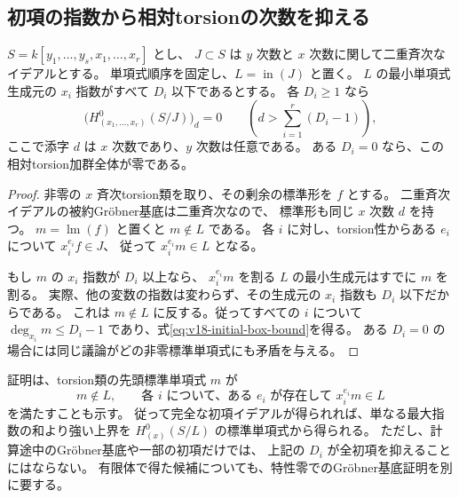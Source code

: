 \subsection{初項の指数から相対torsionの次数を抑える}

\begin{lemma}[初項の箱に入る相対torsion]
\label{lem:v18-initial-box-torsion}
$S=k[y_1,\ldots,y_s,x_1,\ldots,x_r]$ とし、
$J\subset S$ は $y$ 次数と $x$ 次数に関して二重斉次なイデアルとする。
単項式順序を固定し、$L=\operatorname{in}(J)$ と置く。
$L$ の最小単項式生成元の $x_i$ 指数がすべて $D_i$ 以下であるとする。
各 $D_i\ge1$ なら
\begin{equation}\label{eq:v18-initial-box-bound}
 \bigl(H^0_{(x_1,\ldots,x_r)}(S/J)\bigr)_d=0
 \qquad\left(d>\sum_{i=1}^r(D_i-1)\right),
\end{equation}
ここで添字 $d$ は $x$ 次数であり、$y$ 次数は任意である。
ある $D_i=0$ なら、この相対torsion加群全体が零である。
\end{lemma}

\begin{proof}
非零の $x$ 斉次torsion類を取り、その剰余の標準形を $f$ とする。
二重斉次イデアルの被約Gr\"obner基底は二重斉次なので、
標準形も同じ $x$ 次数 $d$ を持つ。
$m=\operatorname{lm}(f)$ と置くと $m\notin L$ である。
各 $i$ に対し、torsion性からある $e_i$ について $x_i^{e_i}f\in J$、
従って $x_i^{e_i}m\in L$ となる。

もし $m$ の $x_i$ 指数が $D_i$ 以上なら、
$x_i^{e_i}m$ を割る $L$ の最小生成元はすでに $m$ を割る。
実際、他の変数の指数は変わらず、その生成元の $x_i$ 指数も $D_i$ 以下だからである。
これは $m\notin L$ に反する。従ってすべての $i$ について
$\deg_{x_i}m\le D_i-1$ であり、式\eqref{eq:v18-initial-box-bound}を得る。
ある $D_i=0$ の場合には同じ議論がどの非零標準単項式にも矛盾を与える。
\end{proof}

\begin{remark}
\label{rem:v18-initial-torsion-certificate}
証明は、torsion類の先頭標準単項式 $m$ が
\[
 m\notin L,\qquad
 \text{各 }i\text{ について、ある }e_i\text{ が存在して }x_i^{e_i}m\in L
\]
を満たすことも示す。
従って完全な初項イデアルが得られれば、単なる最大指数の和より強い上界を
$H^0_{(x)}(S/L)$ の標準単項式から得られる。
ただし、計算途中のGr\"obner基底や一部の初項だけでは、
上記の $D_i$ が全初項を抑えることにはならない。
有限体で得た候補についても、特性零でのGr\"obner基底証明を別に要する。
\end{remark}

